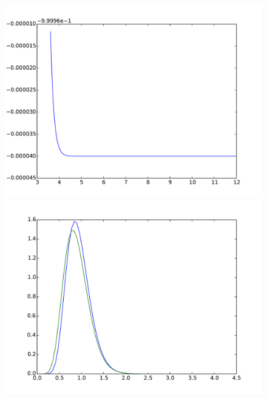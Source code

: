 \documentclass{article}
\begin{document}
\begin{figure}[htb]
\begin{minipage}{.3\textwidth}
	\end{minipage}
	\begin{minipage}{.3\textwidth}
		\centering
		\includegraphics[width=0.97\linewidth]{bootstrap-filter/relative_tail_simple_3_1.pdf}
	\end{minipage}
	\begin{minipage}{.3\textwidth}
		\centering
		\includegraphics[width=0.97\linewidth]{bootstrap-filter/global_simple_4_3.pdf}
	\end{minipage}
	\begin{minipage}{.3\textwidth}
		\centering

\end{minipage}
\end{figure}
\end{document}
